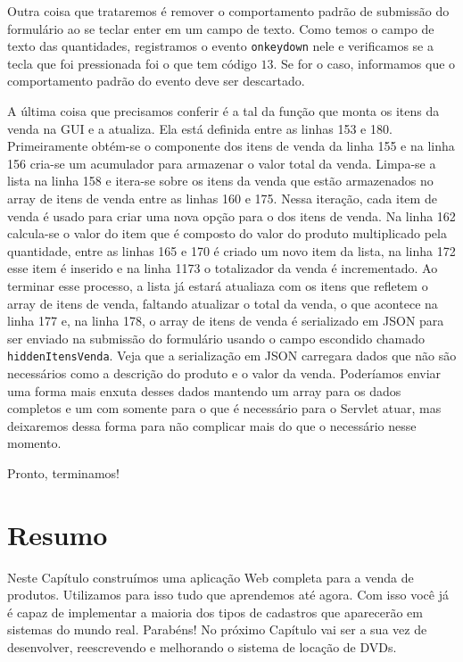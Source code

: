 Outra coisa que trataremos é remover o comportamento padrão de submissão do formulário ao se teclar enter em um campo de texto. Como temos o campo de texto das quantidades, registramos o evento \texttt{onkeydown} nele e verificamos se a tecla que foi pressionada foi o  que tem código $13$. Se for o caso, informamos que o comportamento padrão do evento deve ser descartado.

A última coisa que precisamos conferir é a tal da função que monta os itens da venda na GUI e a atualiza. Ela está definida entre as linhas 153 e 180. Primeiramente obtém-se o componente dos itens de venda da linha 155 e na linha 156 cria-se um acumulador para armazenar o valor total da venda. Limpa-se a lista na linha 158 e itera-se sobre os itens da venda que estão armazenados no array de itens de venda entre as linhas 160 e 175. Nessa iteração, cada item de venda é usado para criar uma nova opção para o  dos itens de venda. Na linha 162 calcula-se o valor do item que é composto do valor do produto multiplicado pela quantidade, entre as linhas 165 e 170 é criado um novo item da lista, na linha 172 esse item é inserido e na linha 1173 o totalizador da venda é incrementado. Ao terminar esse processo, a lista já estará atualiaza com os itens que refletem o array de itens de venda, faltando atualizar o total da venda, o que acontece na linha 177 e, na linha 178, o array de itens de venda é serializado em JSON para ser enviado na submissão do formulário usando o campo escondido chamado \texttt{hiddenItensVenda}. Veja que a serialização em JSON carregara dados que não são necessários como a descrição do produto e o valor da venda. Poderíamos enviar uma forma mais enxuta desses dados mantendo um array para os dados completos e um com somente para o que é necessário para o Servlet atuar, mas deixaremos dessa forma para não complicar mais do que o necessário nesse momento.

Pronto, terminamos!


\section{Resumo}

Neste Capítulo construímos uma aplicação Web completa para a venda de produtos. Utilizamos para isso tudo que aprendemos até agora. Com isso você já é capaz de implementar a maioria dos tipos de cadastros que aparecerão em sistemas do mundo real. Parabéns! No próximo Capítulo vai ser a sua vez de desenvolver, reescrevendo e melhorando o sistema de locação de DVDs. 


